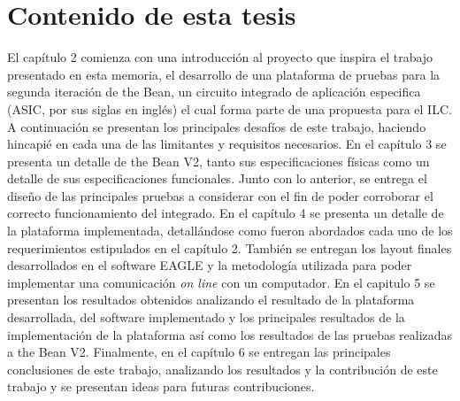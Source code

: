 \section{Contenido de esta tesis}
El capítulo 2 comienza con una introducción al proyecto que inspira el trabajo presentado en esta memoria, el desarrollo de una plataforma de pruebas para la segunda iteración de the Bean, un circuito integrado de aplicación especifica (ASIC, por sus siglas en inglés) el cual forma parte de una propuesta para el ILC. A continuación se presentan los principales desafíos de este trabajo, haciendo hincapié en cada una de las limitantes y requisitos necesarios. En el capítulo 3 se presenta un detalle de the Bean V2, tanto sus especificaciones físicas como un detalle de sus especificaciones funcionales. Junto con lo anterior, se entrega el diseño de las principales pruebas a considerar con el fin de poder corroborar el correcto funcionamiento del integrado. En el capítulo 4 se presenta un detalle de la plataforma implementada, detallándose como fueron abordados cada uno de los requerimientos estipulados en el capítulo 2. También se entregan los layout finales desarrollados en el software EAGLE y la metodología utilizada para poder implementar una comunicación \textit{on line} con un computador. En el capitulo 5 se presentan los resultados obtenidos analizando el resultado de la plataforma desarrollada, del software implementado y los principales resultados de la implementación de la plataforma así como los resultados de las pruebas realizadas a the Bean V2. Finalmente, en el capítulo 6 se entregan las principales conclusiones de este trabajo, analizando los resultados y la contribución de este trabajo y se presentan ideas para futuras contribuciones.  